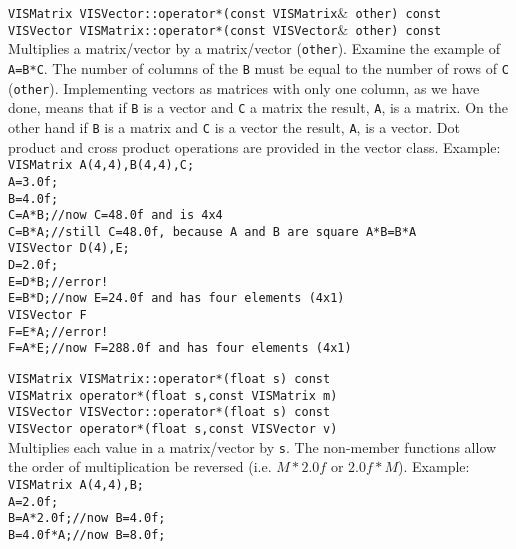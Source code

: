 \begin{description}
{\tt VISMatrix VISVector::operator*(const VISMatrix$\&$ other) const}\\
{\tt VISVector VISMatrix::operator*(const VISVector$\&$ other) const}\\
Multiplies a matrix/vector by a matrix/vector ({\tt other}).
Examine the example of {\tt A=B*C}.
The number of columns of the {\tt B} must be equal to the number of rows
of {\tt C} ({\tt other}).  Implementing vectors as matrices with only one
column, as we have done, means that
if {\tt B} is a vector and {\tt C} a matrix the result, {\tt A},
is a matrix.  On the other hand if {\tt B} is a matrix and {\tt C}
is a vector the result, {\tt A}, is a vector.
Dot product and cross product operations are provided in the vector
class.  Example:\\
{\tt VISMatrix A(4,4),B(4,4),C;}\\
{\tt A=3.0f;}\\
{\tt B=4.0f;}\\
{\tt C=A*B;//now C=48.0f and is 4x4}\\
{\tt C=B*A;//still C=48.0f, because A and B are square A*B=B*A}\\
{\tt VISVector D(4),E;}\\
{\tt D=2.0f;}\\
{\tt E=D*B;//error!}\\
{\tt E=B*D;//now E=24.0f and has four elements (4x1)}\\
{\tt VISVector F}\\
{\tt F=E*A;//error!}\\
{\tt F=A*E;//now F=288.0f and has four elements (4x1)}
\item[{\tt operator*(s)} --]
{\tt VISMatrix VISMatrix::operator*(float s) const}\\
{\tt VISMatrix operator*(float s,const VISMatrix m)}\\
{\tt VISVector VISVector::operator*(float s) const}\\
{\tt VISVector operator*(float s,const VISVector v)}\\
Multiplies each value in a matrix/vector by {\tt s}.
The non-member functions allow the order
of multiplication be reversed (i.e. $M*2.0f$ or $2.0f*M$).  Example:\\
{\tt VISMatrix A(4,4),B;}\\
{\tt A=2.0f;}\\
{\tt B=A*2.0f;//now B=4.0f;}\\
{\tt B=4.0f*A;//now B=8.0f;}\\
\item[{\tt operator/(s)} --]

\end{description}
